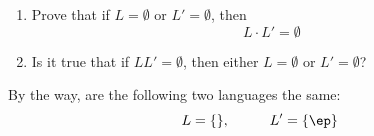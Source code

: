   \begin{enumerate}

  \item
    Prove that 
    if $L = \emptyset$ or $L' = \emptyset$, then
    \[
    L \cdot L' = \emptyset
    \]
    
  \item
    Is it true that if $LL' = \emptyset$, then either $L = \emptyset$
    or $L' = \emptyset$?
    
  \end{enumerate}


  By the way, are the following two languages the same:
  \[
  L = \{\}, \hspace{1cm}
  L' = \{\ep\}
  \]
  
